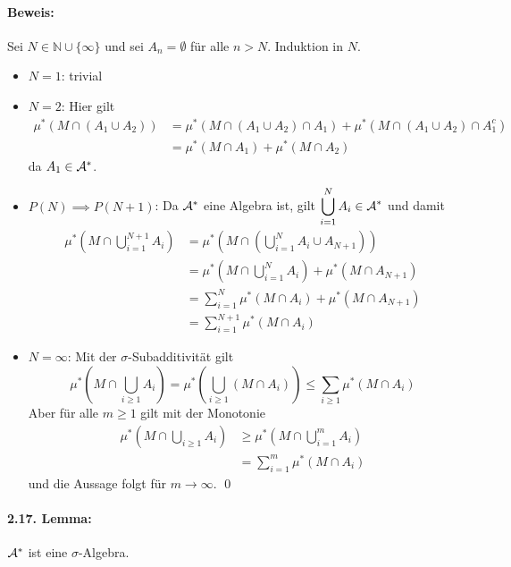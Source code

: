 \documentclass[12pt]{report}
\begin{document}
\paragraph{Beweis:}Sei $N\in\mathbb{N}\cup\{\infty\}$ und sei $A_n=\emptyset$ f\"ur alle $n>N$. Induktion in $N$.
\begin{itemize}
    \item $N=1$: trivial
    \item $N=2$: Hier gilt 
    \begin{align*}
        \mu^*(M\cap(A_1\cup A_2))&=\mu^*(M\cap(A_1\cup A_2)\cap A_1)+\mu^*(M\cap(A_1\cup A_2)\cap A_1^c)\\
        &=\mu^*(M\cap A_1)+\mu^*(M\cap A_2)
    \end{align*}
    da $A_1\in\mathcal{A}^*$.
    \item $P(N)\implies P(N+1)$: Da $\mathcal{A}^*$ eine Algebra ist, gilt $\displaystyle\bigcup_{i=1}^NA_i\in\mathcal{A}^*$ und damit
    \begin{align*}
        \mu^*\left(M\cap\bigcup_{i=1}^{N+1}A_i\right)&=\mu^*\left(M\cap\left(\bigcup_{i=1}^{N}A_i\cup A_{N+1}\right)\right)\\
        &=\mu^*\left(M\cap \bigcup_{i=1}^N A_i\right)+\mu^*(M\cap A_{N+1})\\
        &=\sum_{i=1}^N\mu^*(M\cap A_i)+\mu^*(M\cap A_{N+1})\\
        &=\sum_{i=1}^{N+1}\mu^*(M\cap A_i)
    \end{align*}
    \item $N=\infty$: Mit der $\sigma$-Subadditivit\"at gilt
    $$\mu^*\left(M\cap\bigcup_{i\geq1}A_i\right)=\mu^*\left(\bigcup_{i\geq1}(M\cap A_i)\right)\leq\sum_{i\geq1}\mu^*(M\cap A_i)$$
    Aber f\"ur alle $m\geq1$ gilt mit der Monotonie
    \begin{align*}
        \mu^*\left(M\cap\bigcup_{i\geq1}A_i\right)&\geq\mu^*\left(M\cap\bigcup_{i=1}^mA_i\right)\\
        &=\sum_{i=1}^m\mu^*(M\cap A_i)
    \end{align*}
    und die Aussage folgt f\"ur $m\to\infty$. \qed
\end{itemize}

\paragraph{2.17. Lemma:}$\mathcal{A}^*$ ist eine $\sigma$-Algebra. 
\end{document}
